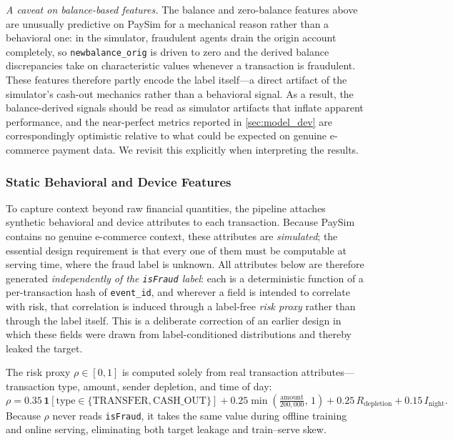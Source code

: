 \noindent\textit{A caveat on balance-based features.} The balance and zero-balance features above are unusually predictive on PaySim for a mechanical reason rather than a behavioral one: in the simulator, fraudulent agents drain the origin account completely, so \texttt{newbalance\_orig} is driven to zero and the derived balance discrepancies take on characteristic values whenever a transaction is fraudulent. These features therefore partly encode the label itself---a direct artifact of the simulator's cash-out mechanics \citep{lopez2016paysim} rather than a behavioral signal.
As a result, the balance-derived signals should be read as simulator artifacts that inflate apparent performance, and the near-perfect metrics reported in \cref{sec:model_dev} are correspondingly optimistic relative to what could be expected on genuine e-commerce payment data. We revisit this explicitly when interpreting the results.

\subsubsection{Static Behavioral and Device Features}
To capture context beyond raw financial quantities, the pipeline attaches synthetic behavioral and device attributes to each transaction. Because PaySim contains no genuine e-commerce context, these attributes are \emph{simulated}; the essential design requirement is that every one of them must be computable at serving time, where the fraud label is unknown. All attributes below are therefore generated \emph{independently of the \texttt{isFraud} label}: each is a deterministic function of a per-transaction hash of \texttt{event\_id}, and wherever a field is intended to correlate with risk, that correlation is induced through a label-free \emph{risk proxy} rather than through the label itself. This is a deliberate correction of an earlier design in which these fields were drawn from label-conditioned distributions and thereby leaked the target.

The risk proxy $\rho \in [0,1]$ is computed solely from real transaction attributes---transaction type, amount, sender depletion, and time of day:
\begin{equation}
  \rho = 0.35\,\mathbf{1}[\text{type} \in \{\text{TRANSFER}, \text{CASH\_OUT}\}] + 0.25\min\!\left(\tfrac{\text{amount}}{200{,}000},\, 1\right) + 0.25\,R_{\text{depletion}} + 0.15\,I_{\text{night}}.
  \label{eq:risk-proxy}
\end{equation}
Because $\rho$ never reads \texttt{isFraud}, it takes the same value during offline training and online serving, eliminating both target leakage and train--serve skew.

